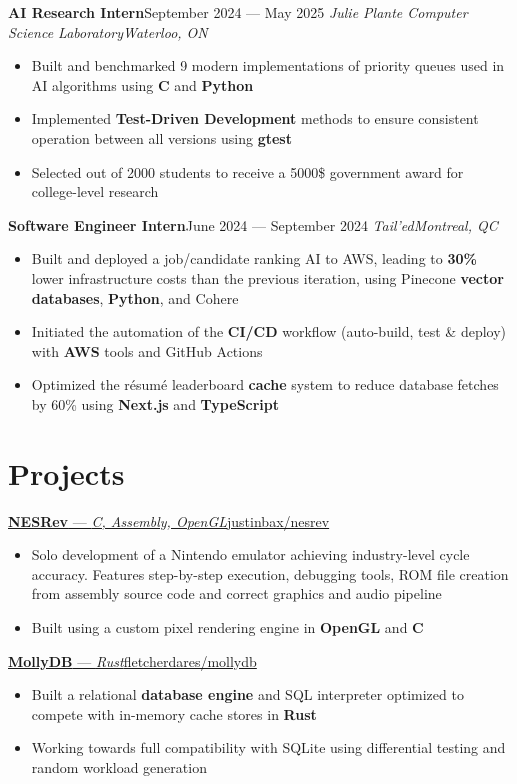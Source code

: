 \documentclass{article}
\newcommand{\newrole}[4]{
    {\normalfont\textbf{#1}\hfill#3}
    \newline
    \textit{#2}\hfill\textit{#4}
}
\newcommand{\shortlinkrole}[4]{
    {\href{#3}{\normalfont\textbf{#1} --- \textit{#2}\hfill#4\:\faExternalLink}\vspace*{-4pt}}
}
\newenvironment{bulletpoints}{\begin{itemize}\setlength\itemsep{-0.2em}}{\end{itemize}}
\begin{document}
\newrole{AI Research Intern}{Julie Plante Computer Science Laboratory}{September 2024 --- May 2025}{Waterloo, ON}
\begin{bulletpoints}
    \item Built and benchmarked 9 modern implementations of priority queues used in AI algorithms using \textbf{C} and \textbf{Python}
    \item Implemented \textbf{Test-Driven Development} methods to ensure consistent operation between all versions using \textbf{gtest}
    \item Selected out of 2000 students to receive a 5000\$ government award for college-level research
\end{bulletpoints}

\newrole{Software Engineer Intern}{Tail'ed}{June 2024 --- September 2024}{Montreal, QC}
\begin{bulletpoints}
    \item Built and deployed a job/candidate ranking AI to AWS, leading to \textbf{30\%} lower infrastructure costs than the previous iteration, using Pinecone \textbf{vector databases}, \textbf{Python}, and Cohere
    \item Initiated the automation of the \textbf{CI/CD} workflow (auto-build, test \& deploy) with \textbf{AWS} tools and GitHub Actions
    \item Optimized the résumé leaderboard \textbf{cache} system to reduce database fetches by 60\% using \textbf{Next.js} and \textbf{TypeScript}
\end{bulletpoints}


\section*{Projects}

\shortlinkrole{NESRev}{C, Assembly, OpenGL}{https://github.com/justinbax/nesrev}{justinbax/nesrev}
\begin{bulletpoints}
    \item Solo development of a Nintendo emulator achieving industry-level cycle accuracy. Features step-by-step execution, debugging tools, ROM file creation from assembly source code and correct graphics and audio pipeline
    \item Built using a custom pixel rendering engine in \textbf{OpenGL} and \textbf{C}
\end{bulletpoints}

\shortlinkrole{MollyDB}{Rust}{https://github.com/FletcherDares/mollydb}{fletcherdares/mollydb}
\begin{bulletpoints}
    \item Built a relational \textbf{database engine} and SQL interpreter optimized to compete with in-memory cache stores in \textbf{Rust}
    \item Working towards full compatibility with SQLite using differential testing and random workload generation
\end{bulletpoints}
\end{document}

